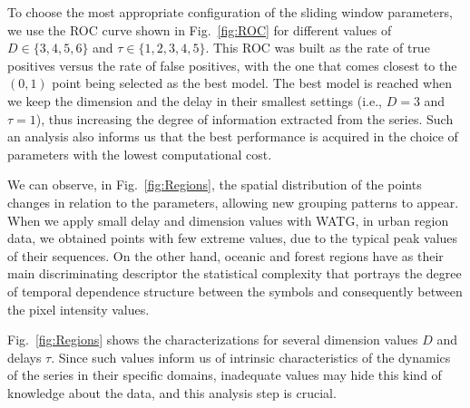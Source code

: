 \documentclass[journal]{IEEEtran}
\begin{document}
To choose the most appropriate configuration of the sliding window parameters, we use the ROC curve shown in Fig.~\ref{fig:ROC} for different values of $D \in \{3, 4, 5, 6 \} $ and $\tau \in \{1, 2, 3, 4, 5 \}$.
This ROC was built as the rate of true positives versus the rate of false positives, with the one that comes closest to the $(0,1)$ point being selected as the best model.
The best model is reached when we keep the dimension and the delay in their smallest settings (i.e., $D = 3$ and $\tau = 1$), thus increasing the degree of information extracted from the series.
Such an analysis also informs us that the best performance is acquired in the choice of parameters with the lowest computational cost.

We can observe, in Fig.~\ref{fig:Regions}, the spatial distribution of the points changes in relation to the parameters, allowing new grouping patterns to appear.
When we apply small delay and dimension values with WATG, in urban region data, we obtained points with few extreme values, due to the typical peak values of their sequences. 
On the other hand, oceanic and forest regions have as their main discriminating descriptor the statistical complexity that portrays the degree of temporal dependence structure between the symbols and consequently between the pixel intensity values.

Fig.~\ref{fig:Regions} shows the characterizations for several dimension values $D$ and delays $\tau$.
Since such values inform us of intrinsic characteristics of the dynamics of the series in their specific domains, inadequate values may hide this kind of knowledge about the data, and this analysis step is crucial.
\end{document}
